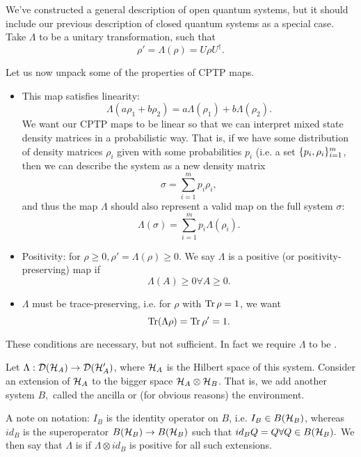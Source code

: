 \begin{exm}
    We've constructed a general description of open quantum systems, but it should include our previous description of closed quantum systems as a special case. Take $\Lambda$ to be a unitary transformation, such that
    \begin{equation}
        \rho'=\Lambda(\rho)=U\rho U^\dagger.
    \end{equation}
    
    
\end{exm}
Let us now unpack some of the properties of CPTP maps.
\begin{itemize}
    \item This map satisfies linearity:
    \begin{equation*}
        \Lambda(a\rho_1 +b\rho_2) = a\Lambda(\rho_1) + b\Lambda(\rho_2).
    \end{equation*}
    We want our CPTP maps to be linear so that we can interpret mixed state density matrices in a probabilistic way. That is, if we have some distribution of density matrices $\rho_i$ given with some probabilities $p_i$ (i.e. a set $\{p_i,\rho_i\}_{i=1}^m$, then we can describe the system as a new density matrix
    \begin{equation*}
        \sigma=\sum_{i=1}^m p_i \rho_i,
    \end{equation*}
    and thus the map $\Lambda$ should also represent a valid map on the full system $\sigma$:
    \begin{equation*}
        \Lambda(\sigma)=\sum_{i=1}^m p_i \Lambda(\rho_i).
    \end{equation*}
    \item Positivity: for $\rho\geq 0, \rho' = \Lambda(\rho) \geq 0$. We say $\Lambda$ is a positive (or positivity-preserving) map if
    \begin{equation}
        \Lambda(A)\geq 0 \forall A \geq 0.
    \end{equation}
    \item $\Lambda$ must be trace-preserving, i.e. for $\rho$ with $\operatorname{Tr} \rho =1$, we want 
    \begin{equation}
        \operatorname{Tr} (\Lambda \rho)=\operatorname{Tr} \rho'=1.
    \end{equation}
\end{itemize}
These conditions are necessary, but not sufficient. In fact we require $\Lambda$ to be . 
\begin{defn}
    Let $\Lambda:\mathcal{D}(\mathcal H_A)\to \mathcal{D}(\mathcal H_A')$, where $\mathcal H_A$ is the Hilbert space of this system. Consider an extension of $\mathcal H_A$ to the bigger space $\mathcal H_A \otimes \mathcal H_B$. That is, we add another system $B,$ called the ancilla or (for obvious reasons) the environment. 

    A note on notation: $I_B$ is the identity operator on $B$, i.e. $I_B\in B(\mathcal H_B)$, whereas $id_B$ is the superoperator $B(\mathcal H_B)\to B(\mathcal H_B)$ such that $id_B Q=Q \forall Q\in B(\mathcal H_B).$ We then say that $\Lambda$ is  if $\Lambda \otimes id_B$ is positive for all such extensions.
\end{defn}
